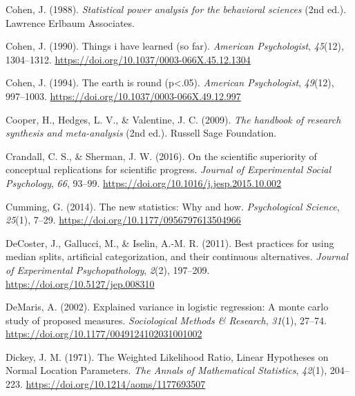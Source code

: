 \documentclass[
]{interact}
\newlength{\cslhangindent}
\newlength{\cslentryspacingunit} %
\newenvironment{CSLReferences}[2] %
 {%
  \setlength{\parindent}{0pt}
  \ifodd #1
  \let\oldpar\par
  \def\par{\hangindent=\cslhangindent\oldpar}
  \fi
  \setlength{\parskip}{#2\cslentryspacingunit}
 }%
 {}
\begin{document}
\begin{CSLReferences}{1}{0}
\leavevmode{}%
Cohen, J. (1988). \emph{Statistical power analysis for the behavioral
sciences} (2nd ed.). Lawrence Erlbaum Associates.

\leavevmode{}%
Cohen, J. (1990). Things i have learned (so far). \emph{American
Psychologist}, \emph{45}(12), 1304--1312.
\url{https://doi.org/10.1037/0003-066X.45.12.1304}

\leavevmode{}%
Cohen, J. (1994). The earth is round
(p{\enspace}\textless{}{\enspace}.05). \emph{American Psychologist},
\emph{49}(12), 997--1003.
\url{https://doi.org/10.1037/0003-066X.49.12.997}

\leavevmode{}%
Cooper, H., Hedges, L. V., \& Valentine, J. C. (2009). \emph{The
handbook of research synthesis and meta-analysis} (2nd ed.). Russell
Sage Foundation.

\leavevmode{}%
Crandall, C. S., \& Sherman, J. W. (2016). On the scientific superiority
of conceptual replications for scientific progress. \emph{Journal of
Experimental Social Psychology}, \emph{66}, 93--99.
\url{https://doi.org/10.1016/j.jesp.2015.10.002}

\leavevmode{}%
Cumming, G. (2014). The new statistics: Why and how. \emph{Psychological
Science}, \emph{25}(1), 7--29.
\url{https://doi.org/10.1177/0956797613504966}

\leavevmode{}%
DeCoster, J., Gallucci, M., \& Iselin, A.-M. R. (2011). Best practices
for using median splits, artificial categorization, and their continuous
alternatives. \emph{Journal of Experimental Psychopathology},
\emph{2}(2), 197--209. \url{https://doi.org/10.5127/jep.008310}

\leavevmode{}%
DeMaris, A. (2002). Explained variance in logistic regression: A monte
carlo study of proposed measures. \emph{Sociological Methods \&
Research}, \emph{31}(1), 27--74.
\url{https://doi.org/10.1177/0049124102031001002}

\leavevmode{}%
Dickey, J. M. (1971). {The Weighted Likelihood Ratio, Linear Hypotheses
on Normal Location Parameters}. \emph{The Annals of Mathematical
Statistics}, \emph{42}(1), 204--223.
\url{https://doi.org/10.1214/aoms/1177693507}


\end{CSLReferences}
\end{document}
